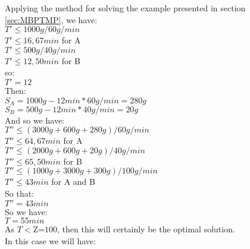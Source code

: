 \documentclass[preprint,12pt,authoryear]{elsarticle}
\begin{document}
Applying the method for solving the example presented in section \ref{sec:MBPTMP}, we have: \\

$T' \leq 1000g / 60g/min$ \\

$T' \leq 16,67 min$ \quad for A \\

$T' \leq 500g / 40g/min$ \\

$T' \leq 12,50 min$ \quad for B \\

so: \\

$T' = 12$ \\

Then:\\

$S_A = 1000g - 12min * 60g/min = 280g$ \\

$S_B = 500g - 12min * 40g/min = 20g$ \\

And so we have: \\

$T'' \leq (3000g + 600g + 280g) / 60g/min$ \\

$T'' \leq 64,67 min$ \quad for A \\

$T'' \leq (2000g + 600g + 20g) / 40g/min$ \\

$T'' \leq 65,50 min$ \quad for B \\

$T'' \leq (1000g + 3000g + 300g) / 100g/min$ \\

$T'' \leq 43 min$ \quad for A and B \\

So that: \\

$T'' = 43 min$ \\

So we have: \\

$ T = 55 min$ \\

As $T<\textrm{Z=100}$, then this will certainly be the optimal solution. \\

In this case we will have: \\
\end{document}
